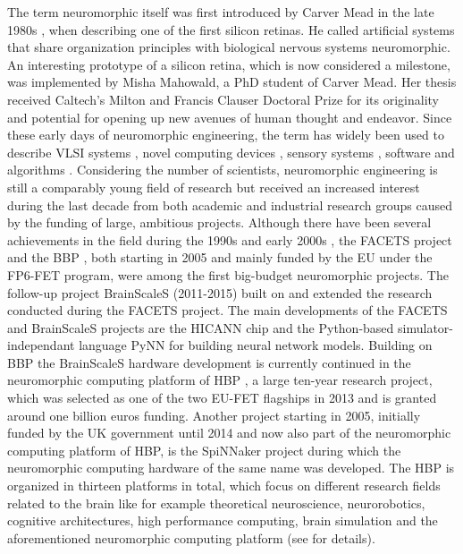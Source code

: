 The term neuromorphic itself was first introduced by Carver Mead in the late 1980s \cite{Mead90}, when describing one of the first silicon retinas.
He called artificial systems that share organization principles with biological nervous systems neuromorphic.
An interesting prototype of a silicon retina, which is now considered a milestone, was implemented by Misha Mahowald, a PhD student of Carver Mead. 
Her thesis received Caltech's Milton and Francis Clauser Doctoral Prize for its originality and potential for opening up new avenues of human thought and endeavor.
Since these early days of neuromorphic engineering, the term has widely been used to describe \ac{VLSI} systems \cite{Mead1989}, novel computing devices \cite{Schemmel2010}, sensory systems \cite{Lichtsteiner2008, Liu2010}, software \cite{Davison2008, Bekolay2014} and algorithms \cite{ReverterValeiras2016}.
Considering the number of scientists, neuromorphic engineering is still a comparably young field of research but received an increased interest during the last decade from both academic and industrial research groups caused by the funding of large, ambitious projects.
Although there have been several achievements in the field during the 1990s \cite{Mead1989, Mahowald1992, Indiveri1997, Cauwenberghs1998} and early 2000s \cite{Liu2002}, the \ac{FACETS} project \cite{FACETS-proj} and the \ac{BBP} \cite{BlueBrain-proj}, both starting in 2005 and mainly funded by the \ac{EU} under the FP6-\ac{FET} program, were among the first big-budget neuromorphic projects.
The follow-up project \ac{BrainScaleS} \cite{BrainScaleS-proj, Schemmel2010} (2011-2015) built on and extended the research conducted during the \ac{FACETS} project. 
The main developments of the \ac{FACETS} and \ac{BrainScaleS} projects are the \ac{HICANN} chip \cite{Schemmel2010} and the Python-based simulator-independant language \ac{PyNN} \cite{Davison2008} for building neural network models.
Building on \ac{BBP} the \ac{BrainScaleS} hardware development is currently continued in the neuromorphic computing platform of \ac{HBP} \cite{HBP-proj, Calimera2013}, a large ten-year research project, which was selected as one of the two \ac{EU}-\ac{FET} flagships in 2013 and is granted around one billion euros funding.
Another project starting in 2005, initially funded by the UK government until 2014 and now also part of the neuromorphic computing platform of \ac{HBP}, is the \ac{SpiNNaker} project \cite{Furber2014} during which the neuromorphic computing hardware of the same name was developed.
The \ac{HBP} is organized in thirteen platforms in total, which focus on different research fields related to the brain like for example theoretical neuroscience, neurorobotics, cognitive architectures, high performance computing, brain simulation and the aforementioned neuromorphic computing platform (see \cite{HBP-proj} for details).\\
